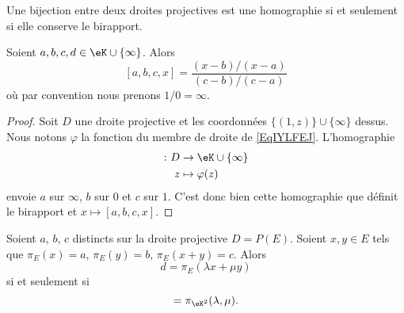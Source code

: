 \begin{theorem}
    Une bijection entre deux droites projectives est une homographie si et seulement si elle conserve le birapport.
\end{theorem}

\begin{proposition}
    Soient \( a,b,c,d\in \eK\cup\{ \infty \}\). Alors
    \begin{equation}        \label{EqIYLFEJ}
        [a,b,c,x]=\frac{ (x-b)/(x-a) }{ (c-b)/(c-a) }
    \end{equation}
    où par convention nous prenons \( 1/0=\infty\).
\end{proposition}

\begin{proof}
    Soit \( D\) une droite projective et les coordonnées \( \{ (1,z) \}\cup\{ \infty \}\) dessus. Nous notons \( \varphi\) la fonction du membre de droite de \eqref{EqIYLFEJ}. L'homographie
    \begin{equation}
        \begin{aligned}
            \colon D&\to \eK\cup\{ \infty \} \\
            z&\mapsto \varphi(z) 
        \end{aligned}
    \end{equation}
    envoie \( a\) sur \( \infty\), \( b\) sur \( 0\) et \( c\) sur \( 1\). C'est donc bien cette homographie que définit le birapport et \( x\mapsto[a,b,c,x]\).
\end{proof}

\begin{lemma}
    Soient \( a\), \( b\), \( c\) distincts sur la droite projective \( D=P(E)\). Soient \( x,y\in E\) tels que \( \pi_E(x)=a\), \( \pi_E(y)=b\), \( \pi_E(x+y)=c\). Alors
    \begin{equation}
        d=\pi_E(\lambda x+\mu y)
    \end{equation}
    si et seulement si
    \begin{equation}
        [a,b,c,d]=\pi_{\eK^2}(\lambda,\mu).
    \end{equation}
    
\end{lemma}

